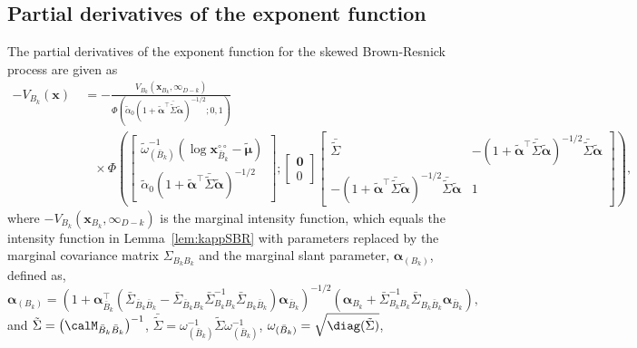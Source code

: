 \documentclass[12pt]{article}
\begin{document}
\subsection{Partial derivatives of the exponent function}

\begin{lemma}
\label{lem:partial_BR}
The partial derivatives of the exponent function for the skewed Brown-Resnick process are given as
\begin{align*}
-V_{B_k}(\bm x) &\ =  - \frac{V_{B_k}(\bm x_{B_k},\bm \infty_{D-k})}{\Phi\left(\tilde\alpha_0\left(1+\tilde{\bm\alpha}^\top\bar{\tilde\Sigma}\tilde{\bm\alpha}\right)^{-1/2}; 0, 1\right)} \\
& \quad \times 
\Phi\left(
\begin{bmatrix} 
\tilde\omega^{-1}_{(\bar B_k)}(\log \bm x_{\bar B_k}^{\circ\circ} - \tilde{\bm\mu})  \\
\tilde\alpha_0(1+\tilde{\bm\alpha}^\top\bar{\tilde\Sigma}\tilde{\bm\alpha})^{-1/2}
\end{bmatrix};
\begin{bmatrix}
\bm 0 \\ 0
\end{bmatrix}
\begin{bmatrix}
	\bar{\tilde\Sigma} & -(1+\tilde{\bm\alpha}^\top\bar{\tilde\Sigma}\tilde{\bm\alpha})^{-1/2}\bar{\tilde\Sigma}\tilde{\bm\alpha} \\
-(1+\tilde{\bm\alpha}^\top\bar{\tilde\Sigma}\tilde{\bm\alpha})^{-1/2}\bar{\tilde\Sigma}\tilde{\bm\alpha} &	1
\end{bmatrix} 
\right), 
\end{align*}
where $-V_{B_k}(\bm x_{B_k}, \bm \infty_{D-k})$ is the marginal intensity function, which equals the intensity function in Lemma~\ref{lem:kappSBR} with parameters replaced by the marginal covariance matrix $\Sigma_{B_kB_k}$ and the marginal slant parameter, $\bm\alpha_{(B_k)}$, defined as, 
$$\bm\alpha_{(B_k)} = \left(1+\bm\alpha_{\bar B_k}^\top\left(\bar\Sigma_{\bar B_k\bar B_k} -\bar \Sigma_{\bar B_k B_k}\bar\Sigma_{B_kB_k}^{-1}\bar\Sigma_{B_k\bar B_k}\right)\bm \alpha_{\bar B_k}\right)^{-1/2}\left(\bm \alpha_{B_k} + \bar\Sigma_{B_kB_k}^{-1}\bar\Sigma_{B_k\bar B_k}\bm\alpha_{\bar B_k}\right),$$
and
$\tilde\Sigma = \left(\calM_{\bar B_k\bar B_k}\right)^{-1}$, 
$\bar{\tilde\Sigma} = \omega_{(\bar B_k)}^{-1}\tilde\Sigma\omega_{(\bar B_k)}^{-1}$, $\omega_{(\bar B_k)}=\sqrt{\diag(\tilde\Sigma)}$,\\

\end{lemma}
\end{document}

